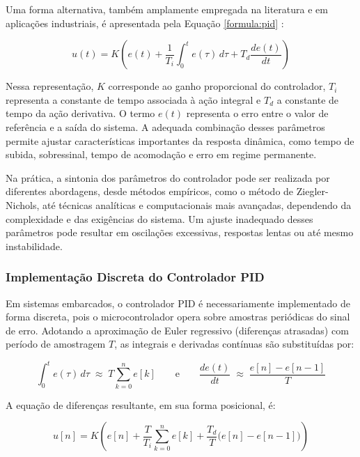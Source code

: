 \documentclass[repeatfields,xlists,xpacks,oneside]{ufrgscca}
\begin{document}
Uma forma alternativa, também amplamente empregada na literatura e em aplicações industriais, é apresentada pela Equação \ref{formula:pid} \cite{Bazanella2005}:

\begin{equation}
    u(t) = K \left( e(t) + \frac{1}{T_i} \int_0^t e(\tau)\, d\tau + T_d \frac{de(t)}{dt} \right)
    \label{formula:pid}
\end{equation}

Nessa representação, $K$ corresponde ao ganho proporcional do controlador, $T_i$ representa a constante de tempo associada à ação integral e $T_d$ a constante de tempo da ação derivativa. O termo $e(t)$ representa o erro entre o valor de referência e a saída do sistema. A adequada combinação desses parâmetros permite ajustar características importantes da resposta dinâmica, como tempo de subida, sobressinal, tempo de acomodação e erro em regime permanente.

Na prática, a sintonia dos parâmetros do controlador pode ser realizada por diferentes abordagens, desde métodos empíricos, como o método de Ziegler-Nichols, até técnicas analíticas e computacionais mais avançadas, dependendo da complexidade e das exigências do sistema. Um ajuste inadequado desses parâmetros pode resultar em oscilações excessivas, respostas lentas ou até mesmo instabilidade.

\subsubsection{Implementação Discreta do Controlador PID}

Em sistemas embarcados, o controlador PID é necessariamente implementado de forma discreta, pois o microcontrolador opera sobre amostras periódicas do sinal de erro. Adotando a aproximação de Euler regressivo (diferenças atrasadas) com período de amostragem $T$, as integrais e derivadas contínuas são substituídas por:

\begin{equation}
    \int_0^t e(\tau)\,d\tau \;\approx\; T \sum_{k=0}^{n} e[k]
    \qquad\text{e}\qquad
    \frac{de(t)}{dt} \;\approx\; \frac{e[n] - e[n-1]}{T}
\end{equation}

A equação de diferenças resultante, em sua forma posicional, é:

\begin{equation}
    u[n] = K\!\left( e[n]
           + \frac{T}{T_i}\sum_{k=0}^{n} e[k]
           + \frac{T_d}{T}\bigl(e[n]-e[n-1]\bigr) \right)
    \label{eq:pid_discreto}
\end{equation}
\end{document}
